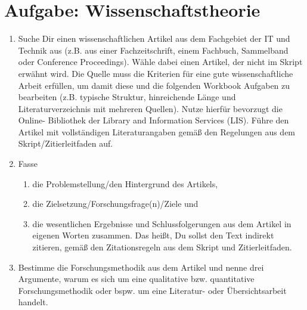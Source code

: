 \documentclass[11pt]{article}
\begin{document}
\section{Aufgabe: Wissenschaftstheorie}
\begin{enumerate}
    \item Suche Dir einen wissenschaftlichen Artikel aus dem Fachgebiet der IT und Technik aus (z.B. aus einer
Fachzeitschrift, einem Fachbuch, Sammelband oder Conference Proceedings). Wähle dabei einen Artikel,
der nicht im Skript erwähnt wird. Die Quelle muss die Kriterien für eine gute wissenschaftliche Arbeit
erfüllen, um damit diese und die folgenden Workbook Aufgaben zu bearbeiten (z.B. typische Struktur,
hinreichende Länge und Literaturverzeichnis mit mehreren Quellen). Nutze hierfür bevorzugt die Online-
Bibliothek der Library and Information Services (LIS). Führe den Artikel mit vollständigen
Literaturangaben gemäß den Regelungen aus dem Skript/Zitierleitfaden auf.
    \item Fasse
        \begin{enumerate}
            \item die Problemstellung/den Hintergrund des Artikels,
            \item die Zielsetzung/Forschungsfrage(n)/Ziele und
            \item die wesentlichen Ergebnisse und Schlussfolgerungen aus dem Artikel in eigenen Worten zusammen.
Das heißt, Du sollst den Text indirekt zitieren, gemäß den Zitationsregeln aus dem Skript und
Zitierleitfaden.
        \end{enumerate}
    \item Bestimme die Forschungsmethodik aus dem Artikel und nenne drei Argumente, warum es sich um eine
qualitative bzw. quantitative Forschungsmethodik oder bspw. um eine Literatur- oder Übersichtsarbeit
handelt.
\end{enumerate}
\printbibliography
\end{document}
